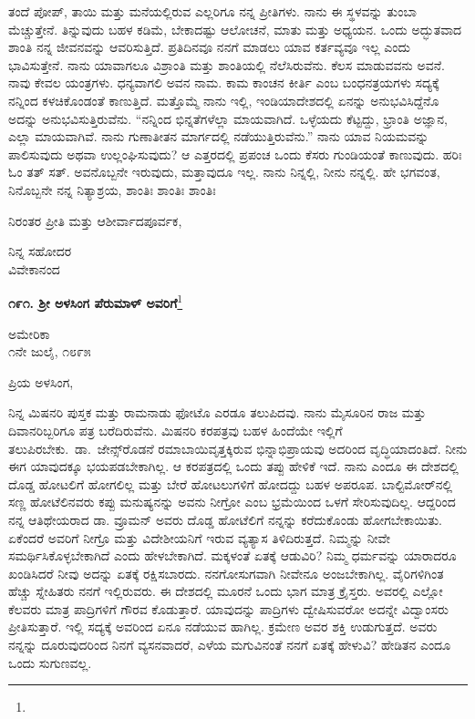ತಂದೆ ಪೋಪ್, ತಾಯಿ ಮತ್ತು ಮನೆಯಲ್ಲಿರುವ ಎಲ್ಲರಿಗೂ ನನ್ನ ಪ್ರೀತಿಗಳು. ನಾನು ಈ ಸ್ಥಳವನ್ನು ತುಂಬಾ ಮೆಚ್ಚುತ್ತೇನೆ. ತಿನ್ನುವುದು ಬಹಳ ಕಡಿಮೆ, ಬೇಕಾದಷ್ಟು ಆಲೋಚನೆ, ಮಾತು ಮತ್ತು ಅಧ್ಯಯನ. ಒಂದು ಅದ್ಭುತವಾದ ಶಾಂತಿ ನನ್ನ ಜೀವನವನ್ನು ಆವರಿಸುತ್ತಿದೆ. ಪ್ರತಿದಿನವೂ ನನಗೆ ಮಾಡಲು ಯಾವ ಕರ್ತವ್ಯವೂ ಇಲ್ಲ ಎಂದು ಭಾವಿಸುತ್ತೇನೆ. ನಾನು ಯಾವಾಗಲೂ ವಿಶ್ರಾಂತಿ ಮತ್ತು ಶಾಂತಿಯಲ್ಲಿ ನೆಲೆಸಿರುವೆನು. ಕೆಲಸ ಮಾಡುವವನು ಅವನೆ. ನಾವು ಕೇವಲ ಯಂತ್ರಗಳು. ಧನ್ಯವಾಗಲಿ ಅವನ ನಾಮ. ಕಾಮ ಕಾಂಚನ ಕೀರ್ತಿ ಎಂಬ ಬಂಧನತ್ರಯಗಳು ಸದ್ಯಕ್ಕೆ ನನ್ನಿಂದ ಕಳಚಿಕೊಂಡಂತೆ ಕಾಣುತ್ತಿದೆ. ಮತ್ತೊಮ್ಮೆ ನಾನು ಇಲ್ಲಿ, ಇಂಡಿಯಾದೇಶದಲ್ಲಿ ಏನನ್ನು ಅನುಭವಿಸಿದ್ದೆನೊ ಅದನ್ನು ಅನುಭವಿಸುತ್ತಿರುವೆನು. “ನನ್ನಿಂದ ಭಿನ್ನತೆಗಳೆಲ್ಲಾ ಮಾಯವಾಗಿದೆ. ಒಳ್ಳೆಯದು ಕೆಟ್ಟದ್ದು, ಭ್ರಾಂತಿ ಅಜ್ಞಾನ, ಎಲ್ಲಾ ಮಾಯವಾಗಿವೆ. ನಾನು ಗುಣಾತೀತನ ಮಾರ್ಗದಲ್ಲಿ ನಡೆಯುತ್ತಿರುವೆನು.”\enginline{-} ನಾನು ಯಾವ ನಿಯಮವನ್ನು ಪಾಲಿಸುವುದು ಅಥವಾ ಉಲ್ಲಂಘಿಸುವುದು? ಆ ಎತ್ತರದಲ್ಲಿ ಪ್ರಪಂಚ ಒಂದು ಕೆಸರು ಗುಂಡಿಯಂತೆ ಕಾಣುವುದು. ಹರಿಃ ಓಂ ತತ್ ಸತ್. ಅವನೊಬ್ಬನೇ ಇರುವುದು, ಮತ್ತಾವುದೂ ಇಲ್ಲ. ನಾನು ನಿನ್ನಲ್ಲಿ, ನೀನು ನನ್ನಲ್ಲಿ. ಹೇ ಭಗವಂತ, ನಿನೊಬ್ಬನೇ ನನ್ನ ನಿತ್ಯಾಶ್ರಯ, ಶಾಂತಿಃ ಶಾಂತಿಃ ಶಾಂತಿಃ

ನಿರಂತರ ಪ್ರೀತಿ ಮತ್ತು ಆಶೀರ್ವಾದಪೂರ್ವಕ,

\vspace{-0.6cm}

{\flushright
ನಿನ್ನ ಸಹೋದರ\\ವಿವೇಕಾನಂದ\par}
\vspace{-0.5cm}

\begin{center}
\textbf{೧೯೧. ಶ‍್ರೀ ಅಳಸಿಂಗ ಪೆರುಮಾಳ್ ಅವರಿಗೆ}\footnote{}
\end{center}

\vspace{-0.6cm}

\begin{flushright}
ಅಮೇರಿಕಾ\\೧ನೇ ಜುಲೈ, ೧೮೯೫
\end{flushright}
\vspace{-0.5cm}

\noindent
ಪ್ರಿಯ ಅಳಸಿಂಗ,

ನಿನ್ನ ಮಿಷನರಿ ಪುಸ್ತಕ ಮತ್ತು ರಾಮನಾಡು ಫೋಟೊ ಎರಡೂ ತಲುಪಿದವು. ನಾನು ಮೈಸೂರಿನ ರಾಜ ಮತ್ತು ದಿವಾನರಿಬ್ಬರಿಗೂ ಪತ್ರ ಬರೆದಿರುವೆನು. ಮಿಷನರಿ ಕರಪತ್ರವು ಬಹಳ ಹಿಂದೆಯೇ ಇಲ್ಲಿಗೆ ತಲುಪಿರಬೇಕು.~ಡಾ.~ಜೇನ್ಸ್‌ರೊಡನೆ ರಮಾಬಾಯಿ\break ವೃತ್ತಕ್ಕಿರುವ ಭಿನ್ನಾಭಿಪ್ರಾಯವು ಅದರಿಂದ ವೃದ್ಧಿಯಾದಂತಿದೆ. ನೀನು ಈಗ ಯಾವುದಕ್ಕೂ ಭಯಪಡಬೇಕಾಗಿಲ್ಲ. ಆ ಕರಪತ್ರದಲ್ಲಿ ಒಂದು ತಪ್ಪು ಹೇಳಿಕೆ ಇದೆ. ನಾನು ಎಂದೂ ಈ ದೇಶದಲ್ಲಿ ದೊಡ್ಡ ಹೋಟಲಿಗೆ ಹೋಗಲಿಲ್ಲ ಮತ್ತು ಬೇರೆ ಹೋಟಲುಗಳಿಗೆ ಹೋದದ್ದು ಬಹಳ ಅಪರೂಪ. ಬಾಲ್ಟಿಮೋರ್‌ನಲ್ಲಿ ಸಣ್ಣ ಹೋಟೆಲಿನವರು ಕಪ್ಪು ಮನುಷ್ಯನನ್ನು ಅವನು ನೀಗ್ರೋ ಎಂಬ ಭ್ರಮೆಯಿಂದ ಒಳಗೆ ಸೇರಿಸುವುದಿಲ್ಲ. ಆದ್ದರಿಂದ ನನ್ನ ಆತಿಥೇಯರಾದ ಡಾ. ವ್ರೂಮನ್ ಅವರು ದೊಡ್ಡ ಹೋಟೆಲಿಗೆ ನನ್ನನ್ನು ಕರೆದುಕೊಂಡು ಹೋಗಬೇಕಾಯಿತು. ಏಕೆಂದರೆ ಅವರಿಗೆ ನೀಗ್ರೊ ಮತ್ತು ವಿದೇಶೀಯನಿಗೆ ಇರುವ ವ್ಯತ್ಯಾಸ ತಿಳಿದಿರುತ್ತದೆ. ನಿಮ್ಮನ್ನು ನೀವೇ ಸಮರ್ಥಿಸಿಕೊಳ್ಳಬೇಕಾಗಿದೆ ಎಂದು ಹೇಳಬೇಕಾಗಿದೆ. ಮಕ್ಕಳಂತೆ ಏತಕ್ಕೆ ಆಡುವಿರಿ? ನಿಮ್ಮ ಧರ್ಮವನ್ನು ಯಾರಾದರೂ ಖಂಡಿಸಿದರೆ ನೀವು ಅದನ್ನು ಏತಕ್ಕೆ ರಕ್ಷಿಸಬಾರದು. ನನಗೋಸುಗವಾಗಿ ನೀವೇನೂ ಅಂಜಬೇಕಾಗಿಲ್ಲ. ವೈರಿಗಳಿಗಿಂತ ಹೆಚ್ಚು ಸ್ನೇಹಿತರು ನನಗೆ ಇಲ್ಲಿರುವರು. ಈ ದೇಶದಲ್ಲಿ ಮೂರನೆ ಒಂದು ಭಾಗ ಮಾತ್ರ ಕ್ರೈಸ್ತರು. ಅವರಲ್ಲಿ ಎಲ್ಲೋ ಕೆಲವರು ಮಾತ್ರ ಪಾದ್ರಿಗಳಿಗೆ ಗೌರವ ಕೊಡುತ್ತಾರೆ. ಯಾವುದನ್ನು ಪಾದ್ರಿಗಳು ದ್ವೇಷಿಸುವರೋ ಅದನ್ನೇ ವಿದ್ವಾಂಸರು ಪ್ರೀತಿಸುತ್ತಾರೆ. ಇಲ್ಲಿ ಸದ್ಯಕ್ಕೆ ಅವರಿಂದ ಏನೂ ನಡೆಯುವ ಹಾಗಿಲ್ಲ. ಕ್ರಮೇಣ ಅವರ ಶಕ್ತಿ ಉಡುಗುತ್ತದೆ. ಅವರು ನನ್ನನ್ನು ದೂರುವುದರಿಂದ ನಿನಗೆ ವ್ಯಸನವಾದರೆ, ಎಳೆಯ ಮಗುವಿನಂತೆ ನನಗೆ ಏತಕ್ಕೆ ಹೇಳುವಿ? ಹೇಡಿತನ ಎಂದೂ ಒಂದು ಸುಗುಣವಲ್ಲ.

